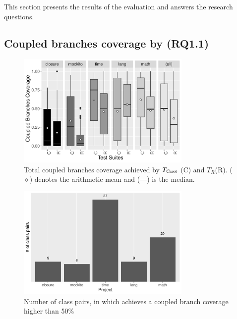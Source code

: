 
This section presents the results of the evaluation and answers the research questions.


\subsection{Coupled branches coverage by \cling (RQ1.1)}

    

\begin{figure}[t]
    \centering
    \includegraphics[width=0.75\textwidth]{papers/cling/figures/cbc-per-project.pdf}
    \caption{Total coupled branches coverage achieved by $T_{\textsc{Cling}}$ (C) and $T_R$(R). ($\diamond$) denotes the arithmetic mean and (---) is the median.}
    \label{fig:cbccoverage}
\end{figure}

\begin{figure}[t]
    \centering
    \includegraphics[width=0.75\textwidth]{papers/cling/figures/cbc-higher-than-50.pdf}
    \caption{Number of class pairs, in which \cling achieves a coupled branch coverage higher than 50\%}
    \label{fig:cbchigher50}
\end{figure}


